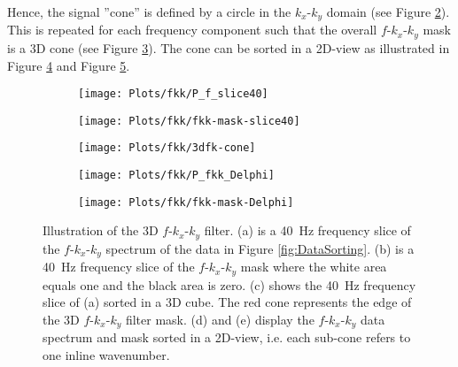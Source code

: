 \documentclass{madrid15WS}
\begin{document}
Hence, the signal ”cone” is defined by a circle in the $k_x$-$k_y$ domain (see Figure \ref{fig:FK-f_slice-mask}). This is repeated for each frequency component such that the overall $f$-$k_x$-$k_y$ mask is a 3D cone (see Figure \ref{fig:FK-f_slice-data3d}). The cone can be sorted in a 2D-view as illustrated in Figure \ref{fig:FK-delphi-data} and Figure \ref{fig:FK-delphi-mask}.

\begin{figure}[h!]
	\centering
	\begin{subfigure}[t]{0.3\textwidth}
		\centering
		\texttt{[image: Plots/fkk/P\_f\_slice40]}
		\caption{}
		\label{fig:FK-f_slice-data}
	\end{subfigure}
	\centering
	\begin{subfigure}[t]{0.3\textwidth}
		\centering
		\texttt{[image: Plots/fkk/fkk-mask-slice40]}
		\caption{}
		\label{fig:FK-f_slice-mask}
	\end{subfigure}
	\centering
	\begin{subfigure}[t]{0.3\textwidth}
		\centering
		\texttt{[image: Plots/fkk/3dfk-cone]}
		\caption{}
		\label{fig:FK-f_slice-data3d}
	\end{subfigure}
	
	\begin{subfigure}[t]{\textwidth}
		\centering
		\texttt{[image: Plots/fkk/P\_fkk\_Delphi]}
		\caption{}
		\label{fig:FK-delphi-data}
	\end{subfigure}
	\par\bigskip
	\begin{subfigure}[t]{\textwidth}
		\centering
		\texttt{[image: Plots/fkk/fkk-mask-Delphi]}
		\caption{}
		\label{fig:FK-delphi-mask}
	\end{subfigure}
	
	\caption{Illustration of the 3D $f$-$k_x$-$k_y$ filter. (a) is a \SI{40}{\hertz} frequency slice of the $f$-$k_x$-$k_y$ spectrum of the data in Figure \ref{fig:DataSorting}. (b) is a \SI{40}{\hertz} frequency slice of the $f$-$k_x$-$k_y$ mask where the white area equals one and the black area is zero. (c) shows the \SI{40}{\hertz} frequency slice of (a) sorted in a 3D cube. The red cone represents the edge of the 3D $f$-$k_x$-$k_y$ filter mask. (d) and (e) display the $f$-$k_x$-$k_y$ data spectrum and mask sorted in a 2D-view, i.e. each sub-cone refers to one inline wavenumber.}
	\label{fig:FKK-Mask}

\end{figure}
\end{document}
